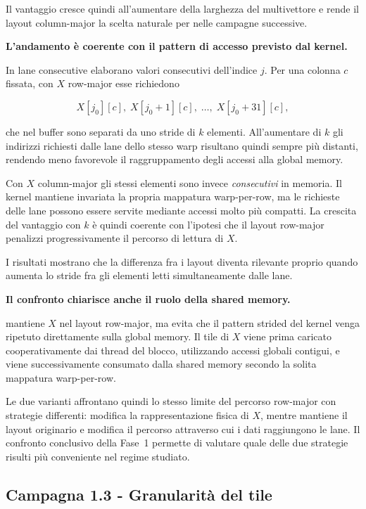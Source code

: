 Il vantaggio cresce
quindi all'aumentare della larghezza del multivettore e rende il layout
column-major la scelta naturale per  nelle campagne
successive.

\textbf{L'andamento è coerente con il pattern di accesso previsto dal kernel.}

In  lane consecutive elaborano valori consecutivi
dell'indice $j$. Per una colonna $c$ fissata, con $X$ row-major esse richiedono

\[
X[j_0][c],\;
X[j_0+1][c],\;
\ldots,\;
X[j_0+31][c],
\]

che nel buffer sono separati da uno stride di $k$ elementi. All'aumentare di
$k$ gli indirizzi richiesti dalle lane dello stesso warp risultano quindi
sempre più distanti, rendendo meno favorevole il raggruppamento degli accessi
alla global memory.

Con $X$ column-major gli stessi elementi sono invece \emph{consecutivi} in memoria.
Il kernel mantiene invariata la propria mappatura warp-per-row, ma le richieste
delle lane possono essere servite mediante accessi molto più compatti. La
crescita del vantaggio con $k$ è quindi coerente con l'ipotesi che il layout
row-major penalizzi progressivamente il percorso di lettura di $X$.

I risultati mostrano che la differenza fra i layout diventa rilevante proprio quando
aumenta lo stride fra gli elementi letti simultaneamente dalle lane.

\textbf{Il confronto chiarisce anche il ruolo della shared memory.}

 mantiene $X$ nel layout row-major, ma evita che
il pattern strided del kernel  venga ripetuto direttamente sulla global
memory. Il tile di $X$ viene prima caricato cooperativamente dai thread del
blocco, utilizzando accessi globali contigui, e viene successivamente
consumato dalla shared memory secondo la solita mappatura warp-per-row.

Le due varianti affrontano quindi lo stesso limite del percorso row-major con
strategie differenti:  modifica la rappresentazione
fisica di $X$, mentre  mantiene il layout
originario e modifica il percorso attraverso cui i dati raggiungono le lane.
Il confronto conclusivo della Fase~1 permette di valutare quale delle due
strategie risulti più conveniente nel regime studiato.


\subsection{Campagna 1.3 - Granularità del tile}
\label{sec:ris-granularita}

